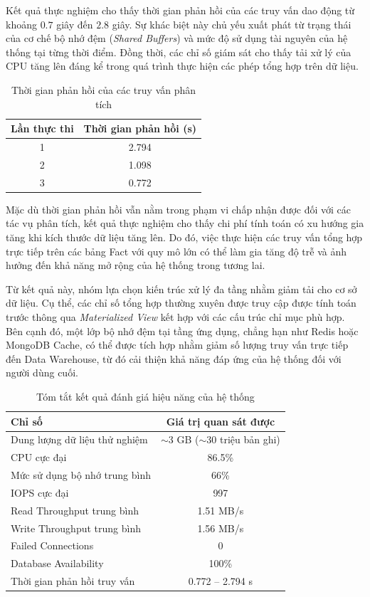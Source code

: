 Kết quả thực nghiệm cho thấy thời gian phản hồi của các truy vấn dao động từ khoảng $0.7$ giây đến $2.8$ giây. Sự khác biệt này chủ yếu xuất phát từ trạng thái của cơ chế bộ nhớ đệm (\textit{Shared Buffers}) và mức độ sử dụng tài nguyên của hệ thống tại từng thời điểm. Đồng thời, các chỉ số giám sát cho thấy tải xử lý của CPU tăng lên đáng kể trong quá trình thực hiện các phép tổng hợp trên dữ liệu.

\begin{table}[H]
\centering
\caption{Thời gian phản hồi của các truy vấn phân tích}
\label{tab:query_time}
\begin{tabular}{|c|c|}
\hline
Lần thực thi & Thời gian phản hồi (s) \\
\hline
1 & 2.794 \\
2 & 1.098 \\
3 & 0.772 \\
\hline
\end{tabular}
\end{table}

Mặc dù thời gian phản hồi vẫn nằm trong phạm vi chấp nhận được đối với các tác vụ phân tích, kết quả thực nghiệm cho thấy chi phí tính toán có xu hướng gia tăng khi kích thước dữ liệu tăng lên. Do đó, việc thực hiện các truy vấn tổng hợp trực tiếp trên các bảng Fact với quy mô lớn có thể làm gia tăng độ trễ và ảnh hưởng đến khả năng mở rộng của hệ thống trong tương lai.

Từ kết quả này, nhóm lựa chọn kiến trúc xử lý đa tầng nhằm giảm tải cho cơ sở dữ liệu. Cụ thể, các chỉ số tổng hợp thường xuyên được truy cập được tính toán trước thông qua \textit{Materialized View} kết hợp với các cấu trúc chỉ mục phù hợp. Bên cạnh đó, một lớp bộ nhớ đệm tại tầng ứng dụng, chẳng hạn như Redis hoặc MongoDB Cache, có thể được tích hợp nhằm giảm số lượng truy vấn trực tiếp đến Data Warehouse, từ đó cải thiện khả năng đáp ứng của hệ thống đối với người dùng cuối.

\begin{table}[H]
\centering
\caption{Tóm tắt kết quả đánh giá hiệu năng của hệ thống}
\label{tab:performance_summary}
\begin{tabular}{|p{5cm}|c|}
\hline
Chỉ số & Giá trị quan sát được \\
\hline
Dung lượng dữ liệu thử nghiệm & $\sim$3 GB ($\sim$30 triệu bản ghi) \\
\hline
CPU cực đại & 86.5\% \\
\hline
Mức sử dụng bộ nhớ trung bình & 66\% \\
\hline
IOPS cực đại & 997 \\
\hline
Read Throughput trung bình & 1.51 MB/s \\
\hline
Write Throughput trung bình & 1.56 MB/s \\
\hline
Failed Connections & 0 \\
\hline
Database Availability & 100\% \\
\hline
Thời gian phản hồi truy vấn & 0.772 -- 2.794 s \\
\hline
\end{tabular}
\end{table}

